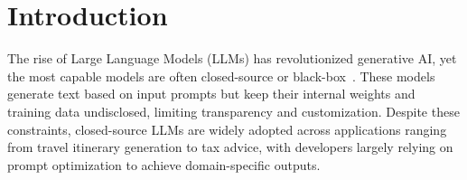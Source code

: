 \section{Introduction}
\label{sec:introduction}




The rise of Large Language Models (LLMs) has revolutionized generative AI, yet the most capable models are often closed-source  or black-box~\citep{achiam2023gpt, bai2022training}. These models generate text based on input prompts but keep their internal weights and training data undisclosed, limiting transparency and customization. Despite these constraints, closed-source LLMs are widely adopted across applications ranging from travel itinerary generation to tax advice, with developers largely relying on prompt optimization to achieve domain-specific outputs. 

